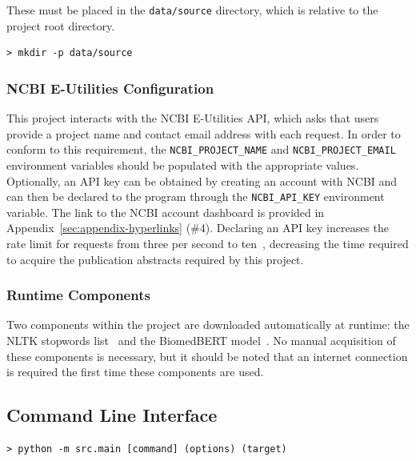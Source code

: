 \documentclass[11pt]{article}
\theoremstyle{plain}
\theoremstyle{definition}
\begin{document}
These must be placed in the \verb|data/source| directory, which is relative to the project root directory.

\begin{Verbatim}[frame=single, fontsize=\small]
    > mkdir -p data/source
\end{Verbatim}

\subsubsection{NCBI E-Utilities Configuration}\label{sec:manual-dependency-ncbi}

This project interacts with the NCBI E-Utilities API, which asks that users provide a project name and contact email address with each request. In order to conform to this requirement, the \verb|NCBI_PROJECT_NAME| and \verb|NCBI_PROJECT_EMAIL| environment variables should be populated with the appropriate values. Optionally, an API key can be obtained by creating an account with NCBI and can then be declared to the program through the \verb|NCBI_API_KEY| environment variable. The link to the NCBI account dashboard is provided in Appendix~\ref{sec:appendix-hyperlinks} (\#4). Declaring an API key increases the rate limit for requests from three per second to ten~\cite{ncbi/2026/eutilities}, decreasing the time required to acquire the publication abstracts required by this project.

\subsubsection{Runtime Components}\label{sec:manual-dependency-runtime}

Two components within the project are downloaded automatically at runtime: the NLTK stopwords list~\cite{loper/2009/natural} and the BiomedBERT model~\cite{gu/2021/domainspecific}. No manual acquisition of these components is necessary, but it should be noted that an internet connection is required the first time these components are used.

\subsection{Command Line Interface}\label{sec:manual-cli}

\begin{Verbatim}[frame=single, fontsize=\small]
    > python -m src.main [command] (options) (target)
\end{Verbatim}
\end{document}
